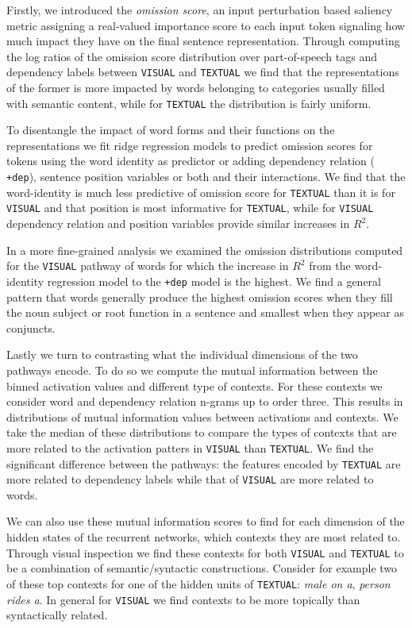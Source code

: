  Firstly, we introduced the \emph{omission score}, an input perturbation based saliency metric assigning a 
 real-valued importance score to each input token signaling how much impact  they have on 
 the final sentence representation. Through computing the 
 log ratios of the omission score distribution over part-of-speech tags and dependency labels between
 \texttt{VISUAL} and \texttt{TEXTUAL} we find that 	the representations of the former
 is more impacted by words belonging to categories
 usually filled with semantic content, 
 while for \texttt{TEXTUAL} the distribution is fairly uniform.
 
 To disentangle the impact of word forms and their functions on the representations 
 we fit ridge regression models 
 to predict omission scores for tokens using the word
 identity as predictor or adding dependency relation ( \texttt{+dep}), 
 sentence position variables or both and their interactions. 
 We find that the word-identity is much less predictive of omission score for \texttt{TEXTUAL}
 than it is for  \texttt{VISUAL} and that position is most informative for \texttt{TEXTUAL},
 while for \texttt{VISUAL} dependency relation and position variables provide similar increases
 in $R^2$. 
 
 In a more fine-grained analysis we examined the omission distributions
 computed for the \texttt{VISUAL} pathway of words for which the increase in 
 $R^2$ from the word-identity regression model to the \texttt{+dep} model is the highest.
 We find a general pattern that words generally produce the highest omission scores
 when they fill the noun subject or root function in a sentence and smallest when they appear 
 as conjuncts.

Lastly we turn to contrasting what the individual dimensions of the two pathways encode.
To do so we compute the mutual information between the binned activation values and different
type of contexts. For these contexts we consider word and dependency relation n-grams up to
order three. This results in distributions of mutual information values between activations and
contexts. We take the median of these distributions to compare the types of contexts that
are more related to the activation patters in  \texttt{VISUAL} than  \texttt{TEXTUAL}. We find
the significant difference between the pathways: the features encoded by  \texttt{TEXTUAL} are
more related to dependency labels while that of \texttt{VISUAL} are more related to words.

We can also use these mutual information scores to find for each dimension of the hidden states
of the recurrent networks, which contexts they are most related to. 
Through visual inspection we find these contexts for both 
\texttt{VISUAL} and \texttt{TEXTUAL} to be a combination of semantic/syntactic constructions. 
Consider for example two of these
top contexts for one of the hidden units of  \texttt{TEXTUAL}: \emph{male on a}, \emph{person rides a}.
In general for \texttt{VISUAL} we find contexts to be more topically than syntactically related.

